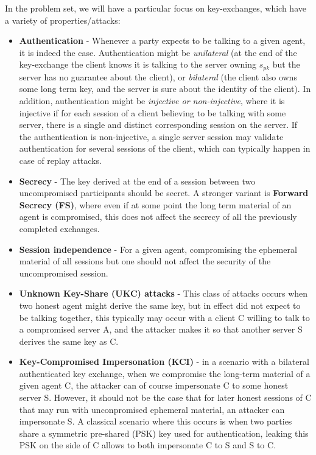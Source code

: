 \documentclass{article}
\newcommand{\sfpk}{\mathit{pk}}
\begin{document}
In the problem set, we will have a particular focus on key-exchanges, which have a variety of properties/attacks:
\begin{itemize}
\item \textbf{Authentication} - Whenever a party expects to be talking to a given agent, it is indeed the case. Authentication might be \emph{unilateral} (at the end of the key-exchange the client knows it is talking to  the server owning $s_\sfpk$ but the server has no guarantee about the client), or \emph{bilateral} (the client also owns some long term key, and the server is sure about the identity of the client). In addition, authentication might be \emph{injective or non-injective}, where it is injective if for each session of a client believing to be talking with some server, there is a single and distinct corresponding session on the server. If the authentication is non-injective, a single server session may validate authentication for several sessions of the client, which can typically happen in case of replay attacks.
\item \textbf{Secrecy} - The key derived at the end of a session between two uncompromised participants should be secret. A stronger variant is \textbf{Forward Secrecy (FS)}, where even if at some point the long term material of an agent is compromised, this does not affect the secrecy of all the previously completed exchanges.
\item \textbf{Session independence} - For a given agent, compromising the ephemeral material of all sessions but one should not affect the security of the uncompromised session.
\item \textbf{Unknown Key-Share (UKC) attacks} -  This class of attacks occurs when two honest agent might derive the same key, but in effect did not expect to be talking together, this typically may occur with a client C willing to talk to a compromised server A, and the attacker makes it so that another server S derives the same key as C.
\item \textbf{Key-Compromised Impersonation (KCI)} - in a scenario with a bilateral authenticated key exchange, when we compromise the long-term material of a given agent C, the attacker can of course impersonate C to some honest server S. However, it should not be the case that for later honest sessions of C that may run with unconpromised ephemeral material, an attacker can impersonate S.  A classical scenario where this occurs is when two parties share a symmetric pre-shared (PSK) key used for authentication, leaking this PSK on the side of C allows to both impersonate C to S and S to C.
\end{itemize}
\end{document}

